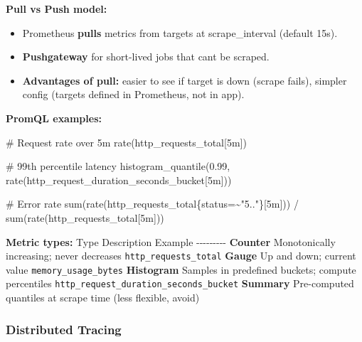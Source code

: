 \documentclass[11pt]{article}
\providecommand{\tightlist}{\setlength{\itemsep}{1pt}\setlength{\parskip}{0pt}}
\newenvironment{Shaded}{\begin{snugshade}}{\end{snugshade}}
\newcommand{\NormalTok}[1]{\textcolor[rgb]{0.81,0.81,0.76}{#1}}
\begin{document}
\textbf{Pull vs Push model:}

\begin{itemize}
\tightlist
\item
  Prometheus \textbf{pulls} metrics from targets at scrape\_interval (default 15s).
\item
  \textbf{Pushgateway} for short-lived jobs that can\textquotesingle t be scraped.
\item
  \textbf{Advantages of pull:} easier to see if target is down (scrape fails), simpler config (targets defined in Prometheus, not in app).
\end{itemize}

\textbf{PromQL examples:}


\begin{Shaded}
\begin{Highlighting}[]
\NormalTok{\# Request rate over 5m}
\NormalTok{rate(http\_requests\_total[5m])}

\NormalTok{\# 99th percentile latency}
\NormalTok{histogram\_quantile(0.99, rate(http\_request\_duration\_seconds\_bucket[5m]))}

\NormalTok{\# Error rate}
\NormalTok{sum(rate(http\_requests\_total\{status=\textasciitilde{}"5.."\}[5m]))}
\NormalTok{/ sum(rate(http\_requests\_total[5m]))}
\end{Highlighting}
\end{Shaded}

\textbf{Metric types:}
\textbar{} Type \textbar{} Description \textbar{} Example \textbar{}
\textbar-\/-\/-\textbar-\/-\/-\textbar-\/-\/-\textbar{}
\textbar{} \textbf{Counter} \textbar{} Monotonically increasing; never decreases \textbar{} \texttt{http\_requests\_total} \textbar{}
\textbar{} \textbf{Gauge} \textbar{} Up and down; current value \textbar{} \texttt{memory\_usage\_bytes} \textbar{}
\textbar{} \textbf{Histogram} \textbar{} Samples in predefined buckets; compute percentiles \textbar{} \texttt{http\_request\_duration\_seconds\_bucket} \textbar{}
\textbar{} \textbf{Summary} \textbar{} Pre-computed quantiles at scrape time \textbar{} (less flexible, avoid) \textbar{}

\subsubsection{Distributed Tracing}\label{distributed-tracing}

\setcodelang{}
\end{document}
